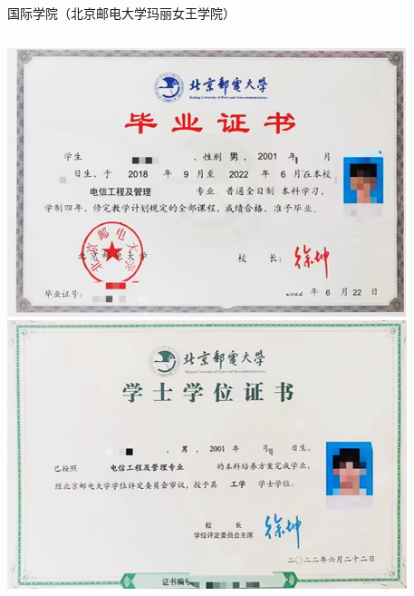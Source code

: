 \documentclass[aspectratio=169, utf8, fontset=windows]{beamer}
\begin{document}
\begin{frame}{国际学院（北京邮电大学玛丽女王学院）}
    \begin{columns}
        \includegraphics[width=\textwidth]{./resources/15.png}\\
        \includegraphics[width=\textwidth]{./resources/16.png}


\end{columns}
\end{frame}
\end{document}
